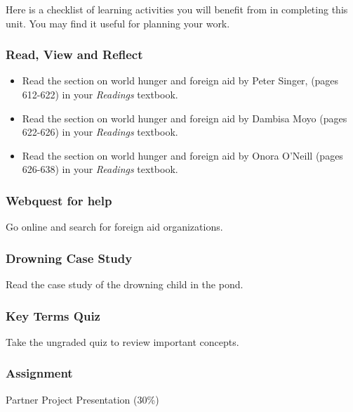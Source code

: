 \documentclass[
]{book}
\providecommand{\tightlist}{%
  \setlength{\itemsep}{0pt}\setlength{\parskip}{0pt}}
\begin{document}
Here is a checklist of learning activities you will benefit from in completing this unit. You may find it useful for planning your work.

\begin{reflect}
\hypertarget{read-view-and-reflect-31}{%
\subsubsection*{Read, View and Reflect}\label{read-view-and-reflect-31}}

\begin{itemize}
\tightlist
\item
  Read the section on world hunger and foreign aid by Peter Singer, (pages 612-622) in your \emph{Readings} textbook.\\
\item
  Read the section on world hunger and foreign aid by Dambisa Moyo (pages 622-626) in your \emph{Readings} textbook.
\item
  Read the section on world hunger and foreign aid by Onora O'Neill (pages 626-638) in your \emph{Readings} textbook.
\end{itemize}

\hypertarget{webquest-for-help}{%
\subsubsection*{Webquest for help}\label{webquest-for-help}}

Go online and search for foreign aid organizations.

\hypertarget{drowning-case-study}{%
\subsubsection*{Drowning Case Study}\label{drowning-case-study}}

Read the case study of the drowning child in the pond.

\hypertarget{key-terms-quiz-8}{%
\subsubsection*{Key Terms Quiz}\label{key-terms-quiz-8}}

Take the ungraded quiz to review important concepts.

\hypertarget{assignment-7}{%
\subsubsection*{\texorpdfstring{\textbf{Assignment}}{Assignment}}\label{assignment-7}}

Partner Project Presentation (30\%)
\end{reflect}
\end{document}
